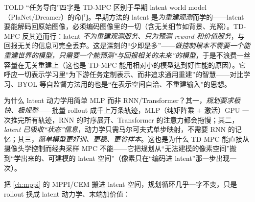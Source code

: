\begin{insight}
TOLD “任务导向”四字是 TD-MPC 区别于早期 latent world model（PlaNet/Dreamer）的命门。早期方法的 latent 是\emph{为重建观测}而学的——latent 要能解码回原始图像，必须编码图像里的一切（含无关细节如背景、光照）。TD-MPC 反其道而行：latent \emph{不为重建观测服务、只为预测 reward 和价值服务}，与回报无关的信息可完全丢弃。这是深刻的“少即是多”——\emph{做控制根本不需要一个能重建世界的模型，只需要一个能预测“与回报相关的未来”的模型}，于是不浪费一丝容量在无关重建上（这也是 TD-MPC 能用相对小的模型达到好性能的原因）。它呼应一切表示学习里“为下游任务定制表示、而非追求通用重建”的智慧——对比学习、BYOL 等自监督方法用的也是“在表示空间自洽、不重建输入”的思想。
\end{insight}

\noindent 为什么 latent 动力学用简单 MLP 而非 RNN/Transformer？其一，\emph{规划要求极快、极规整}——批量 rollout 成千上万条轨迹，MLP（纯矩阵乘 $+$ 激活）GPU 一次推完所有轨迹，RNN 的时序展开、Transformer 的注意力都会拖慢；其二，\emph{latent 已吸收“状态”信息}，动力学只需马尔可夫式单步映射，不需要 RNN 的记忆；其三，\emph{简单模型更好训、更稳、更省样本}。这也是为什么 TD-MPC 能直接从摄像头学控制而经典采样 MPC 不能——它把规划从“无法建模的像素空间”搬到“学出来的、可建模的 latent 空间”（像素只在“编码进 latent”那一步出现一次）。

\begin{algo}\label{alg:mv-tdmpc-plan}
把 \cref{ch:mppi} 的 MPPI/CEM 搬进 latent 空间，规划循环几乎一字不变，只是 rollout 换成 latent 动力学、末端加价值：
\end{algo}

